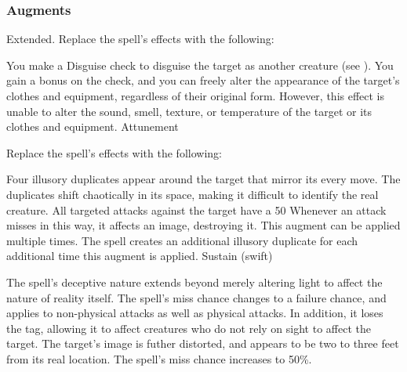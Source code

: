 \subsubsection{Augments}
 Extended.
Replace
the spell's effects with the following:
\begin{augmenteffects}
\spelleffect
You make a Disguise check to disguise the target as another creature (see ).
You gain a  bonus on the check, and you can freely alter the appearance of the target's clothes and equipment, regardless of their original form.
However, this effect is unable to alter the sound, smell, texture, or temperature of the target or its clothes and equipment.
\spelldur Attunement
\end{augmenteffects}
Replace
the spell's effects with the following:
\begin{augmenteffects}
\spelleffect
Four illusory duplicates appear around the target that mirror its every move.
The duplicates shift chaotically in its space, making it difficult to identify the real creature.
All targeted attacks against the target have a 50%
Whenever an attack misses in this way, it affects an image, destroying it.
This augment can be applied multiple times.
The spell creates an additional illusory duplicate for each additional time this augment is applied.
\spelldur Sustain (swift)
\end{augmenteffects}
The spell's deceptive nature extends beyond merely altering light to affect the nature of reality itself.
The spell's miss chance changes to a failure chance, and applies to non-physical attacks as well as physical attacks.
In addition, it loses the  tag, allowing it to affect creatures who do not rely on sight to affect the target.
The target's image is futher distorted, and appears to be two to three feet from its real location.
The spell's miss chance increases to 50\%.
